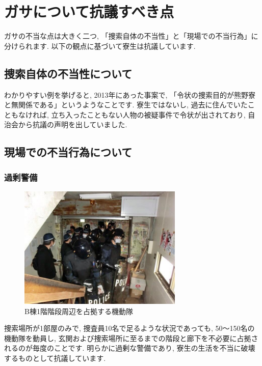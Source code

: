 \section{ガサについて抗議すべき点}
\label{gasa_kogi}
	ガサの不当な点は大きく二つ, 「捜索自体の不当性」と「現場での不当行為」に分けられます. 以下の観点に基づいて寮生は抗議しています.

		\subsection{捜索自体の不当性について}
		 わかりやすい例を挙げると, 2013年にあった事案で, 「令状の捜索目的が熊野寮と無関係である」というようなことです. 寮生ではないし, 過去に住んでいたこともなければ, 立ち入ったこともない人物の被疑事件で令状が出されており, 自治会から抗議の声明を出していました.


    
    

		\subsection{現場での不当行為について}

			

			\subsubsection{過剰警備}

			\begin{figure}
				\centering
				\includegraphics[width=7.8cm]{gazo/gasa.jpg}
				\caption*{\small{B棟1階階段周辺を占拠する機動隊}}
			\end{figure}

			捜索場所が1部屋のみで, 捜査員10名で足るような状況であっても, 50〜150名の機動隊を動員し, 玄関および捜索場所に至るまでの階段と廊下を不必要に占拠されるのが毎度のことです. 明らかに過剰な警備であり, 寮生の生活を不当に破壊するものとして抗議しています.
			
